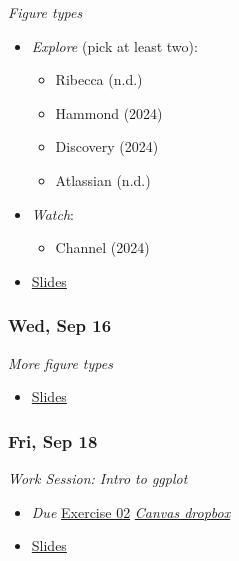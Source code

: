 \documentclass[
  letterpaper,
  DIV=11,
  numbers=noendperiod]{scrartcl}
\providecommand{\tightlist}{%
  \setlength{\itemsep}{0pt}\setlength{\parskip}{0pt}}
\begin{document}
\emph{Figure types}

\begin{itemize}
\tightlist
\item
  \emph{Explore} (pick at least two):

  \begin{itemize}
  \tightlist
  \item
    Ribecca (n.d.)
  \item
    Hammond (2024)
  \item
    Discovery (2024)
  \item
    Atlassian (n.d.)
  \end{itemize}
\item
  \emph{Watch}:

  \begin{itemize}
  \tightlist
  \item
    Channel (2024)
  \end{itemize}
\item
  \href{404.qmd}{Slides}
\end{itemize}

\subsubsection*{Wed, Sep 16}\label{wed-sep-16}

\emph{More figure types}

\begin{itemize}
\tightlist
\item
  \href{404.qmd}{Slides}
\end{itemize}

\subsubsection*{Fri, Sep 18}\label{fri-sep-18}

\emph{Work Session: Intro to ggplot}

\begin{itemize}
\tightlist
\item
   \emph{Due}
  \href{exercises/ex-02-data-viz-outside-psych.qmd}{Exercise 02}
  \textbar{}
  \href{https://psu.instructure.com/courses/2484925/assignments/18448429}{
  \emph{Canvas dropbox}} \textbar{}
\item
  \href{404.qmd}{Slides}
\end{itemize}
\end{document}
